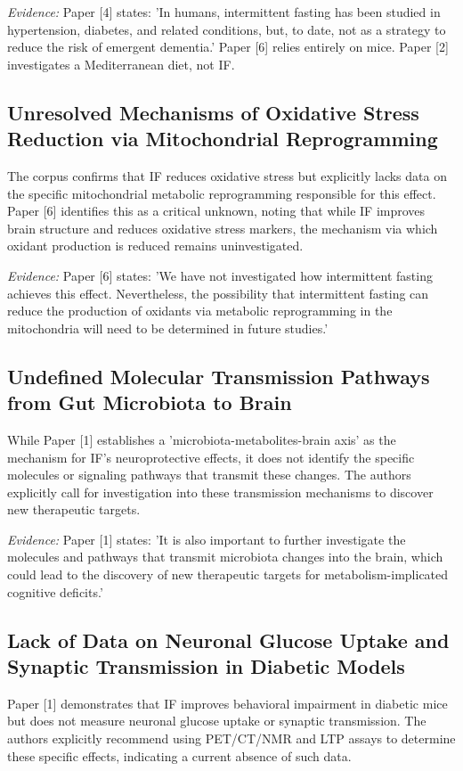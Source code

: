 \documentclass[11pt]{article}
\begin{document}
\textit{Evidence:} Paper [4] states: 'In humans, intermittent fasting has been studied in hypertension, diabetes, and related conditions, but, to date, not as a strategy to reduce the risk of emergent dementia.' Paper [6] relies entirely on mice. Paper [2] investigates a Mediterranean diet, not IF.

\subsection{Unresolved Mechanisms of Oxidative Stress Reduction via Mitochondrial Reprogramming}
The corpus confirms that IF reduces oxidative stress but explicitly lacks data on the specific mitochondrial metabolic reprogramming responsible for this effect. Paper [6] identifies this as a critical unknown, noting that while IF improves brain structure and reduces oxidative stress markers, the mechanism via which oxidant production is reduced remains uninvestigated.

\textit{Evidence:} Paper [6] states: 'We have not investigated how intermittent fasting achieves this effect. Nevertheless, the possibility that intermittent fasting can reduce the production of oxidants via metabolic reprogramming in the mitochondria will need to be determined in future studies.'

\subsection{Undefined Molecular Transmission Pathways from Gut Microbiota to Brain}
While Paper [1] establishes a 'microbiota-metabolites-brain axis' as the mechanism for IF's neuroprotective effects, it does not identify the specific molecules or signaling pathways that transmit these changes. The authors explicitly call for investigation into these transmission mechanisms to discover new therapeutic targets.

\textit{Evidence:} Paper [1] states: 'It is also important to further investigate the molecules and pathways that transmit microbiota changes into the brain, which could lead to the discovery of new therapeutic targets for metabolism-implicated cognitive deficits.'

\subsection{Lack of Data on Neuronal Glucose Uptake and Synaptic Transmission in Diabetic Models}
Paper [1] demonstrates that IF improves behavioral impairment in diabetic mice but does not measure neuronal glucose uptake or synaptic transmission. The authors explicitly recommend using PET/CT/NMR and LTP assays to determine these specific effects, indicating a current absence of such data.
\end{document}
